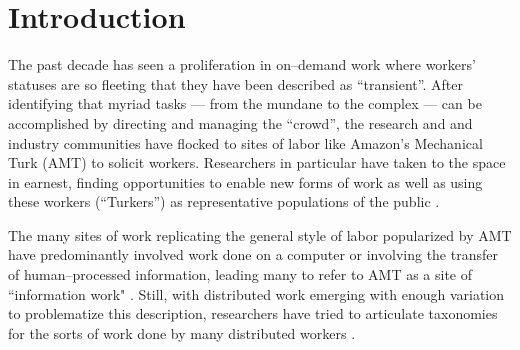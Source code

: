\documentclass[trackingWork]{subfiles}
\begin{document}
\newcommand{\note}[1]{\onlyinsubfile{\textit{#1}}}

\section{Introduction}
The past decade has seen a proliferation in on--demand work
where workers' statuses are so fleeting that 
they have been described as ``transient''.
After identifying that myriad tasks 
--- from the mundane to the complex ---
can be accomplished
by directing and managing the ``crowd'',
the research and and industry communities have flocked to sites of labor
like Amazon's Mechanical Turk (AMT)
to solicit workers.
Researchers in particular have taken to the space in earnest,
finding opportunities to enable new forms of work
as well as using these workers (``Turkers'')
as representative populations of the public
\cite{bernsteinSoylent,redballoon,paolacci2010running}.

The many sites of work replicating
the general style of labor popularized by AMT
have predominantly involved work done on a computer
or involving the transfer of human--processed information,
leading many to refer to AMT as a site of ``information work"
\cite{turkopticon,professionalCrowdworkEthics,IraniFromCriticalDesign,OlsonMakeDistanceWorkWork}.
Still, with distributed work emerging with enough variation to problematize this description,
researchers have tried
to articulate taxonomies for the sorts of work done by many distributed workers
\cite{yuenSurvey,geiger2011managing,quinnbedersonTaxonomy}.
\end{document}
